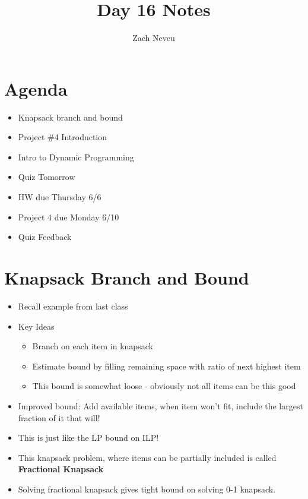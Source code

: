 \documentclass[12pt, letter]{article}
\author{Zach Neveu}
\title{ Day 16 Notes }
\begin{document}
\maketitle

\section{Agenda}%
\label{sec:agenda}
\begin{itemize}
	\item Knapsack branch and bound
	\item Project \#4 Introduction
	\item Intro to Dynamic Programming
	\item Quiz Tomorrow
	\item HW due Thursday 6/6
	\item Project 4 due Monday 6/10
	\item Quiz Feedback
\end{itemize}

\section{Knapsack Branch and Bound}%
\label{sec:knapsack_branch_and_bound}
\begin{itemize}
	\item Recall example from last class
	\item Key Ideas
	\begin{itemize}
		\item Branch on each item in knapsack
		\item Estimate bound by filling remaining space with ratio of next highest item
		\item This bound is somewhat loose - obviously not all items can be this good
	\end{itemize}
	\item Improved bound: Add available items, when item won't fit, include the largest fraction of it that will!
	\item This is just like the LP bound on ILP!
	\item This knapsack problem, where items can be partially included is called \textbf{Fractional Knapsack} 
	\item Solving fractional knapsack gives tight bound on solving 0-1 knapsack.
\end{itemize}
\end{document}
